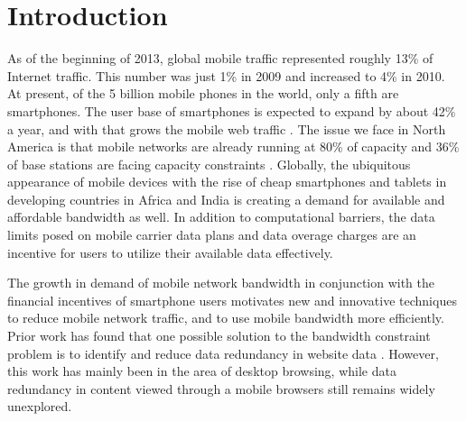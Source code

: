\section{Introduction}
As of the beginning of 2013, global mobile traffic represented roughly 13\% of Internet traffic. This number was just 1\% in 2009 and increased to 4\% in 2010. At present, of the 5 billion mobile phones in the world, only a fifth are smartphones. The user base of smartphones is expected to expand by about 42\% a year, and with that grows the mobile web traffic \cite{olson}. The issue we face in North America is that mobile networks are already running at 80\% of capacity and 36\% of base stations are facing capacity constraints \cite{baldwin}. Globally, the ubiquitous appearance of mobile devices with the rise of cheap smartphones and tablets in developing countries in Africa and India is creating a demand for available and affordable bandwidth as well. In addition to computational barriers, the data limits posed on mobile carrier data plans and data overage charges are an incentive for users to utilize their available data effectively. 

The growth in demand of mobile network bandwidth in conjunction with the financial incentives of smartphone users motivates new and innovative techniques to reduce mobile network traffic, and to use mobile bandwidth more efficiently. Prior work has found that one possible solution to the bandwidth constraint problem is to identify and reduce data redundancy in website data \cite{spring}. However, this work has mainly been in the area of desktop browsing, while data redundancy in content viewed through a mobile browsers still remains widely unexplored.  

